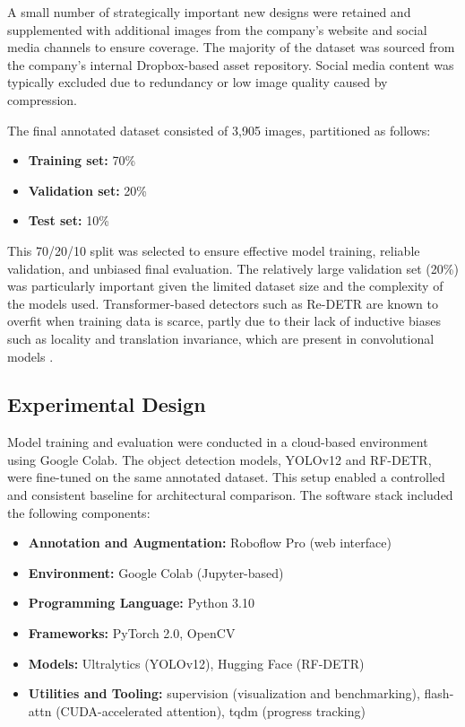 \documentclass[a4paper,10pt,twocolumn]{article}
\numberwithin{figure}{section}
\numberwithin{table}{section}
\begin{document}
A small number of strategically important new designs were
retained and supplemented with additional images from the 
company’s website and social media channels to ensure 
coverage. The majority of the dataset was sourced from the 
company’s internal Dropbox-based asset repository. Social media 
content was typically excluded due to redundancy or 
low image quality caused by compression.

The final annotated dataset consisted of 3,905 images, 
partitioned as follows:
\begin{itemize}
    \item \textbf{Training set:} 70\%
    \item \textbf{Validation set:} 20\%
    \item \textbf{Test set:} 10\%
\end{itemize}

This 70/20/10 split was selected to ensure effective 
model training, reliable validation, and unbiased final 
evaluation. The relatively large validation set (20\%) 
was particularly important given the limited dataset 
size and the complexity of the models used. 
Transformer-based detectors such as Re-DETR are 
known to overfit when training data is scarce, 
partly due to their lack of inductive biases such as
locality and translation invariance, which are present 
in convolutional models \citep{carion2020detr}. 


\subsection{Experimental Design}
\vspace{0.3cm} 


Model training and evaluation were conducted in a 
cloud-based environment using Google Colab. The object 
detection models, YOLOv12 and RF-DETR, were 
fine-tuned on the same annotated dataset. 
This setup enabled a controlled and consistent 
baseline for architectural comparison. 
The software stack included the following components:

\begin{itemize}
    \item \textbf{Annotation and Augmentation:} Roboflow Pro (web interface)
    \item \textbf{Environment:} Google Colab (Jupyter-based)
    \item \textbf{Programming Language:} Python 3.10
    \item \textbf{Frameworks:} PyTorch 2.0, OpenCV
    \item \textbf{Models:}  Ultralytics (YOLOv12), Hugging Face (RF-DETR)
    \item \textbf{Utilities and Tooling:} supervision (visualization and benchmarking), flash-attn (CUDA-accelerated attention), tqdm (progress tracking) 
\end{itemize}
\end{document}
